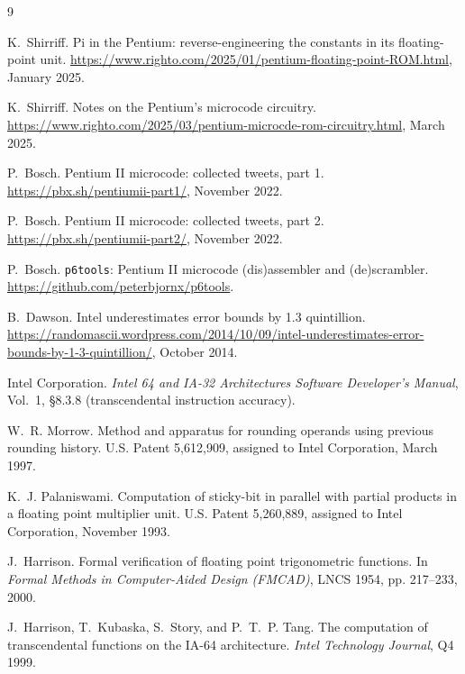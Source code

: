 \documentclass[11pt]{article}
\begin{document}
\clearpage
\begin{thebibliography}{9}
\scriptsize
\raggedright
\itemsep0pt

K.~Shirriff.
\newblock Pi in the Pentium: reverse-engineering the constants in its
  floating-point unit.
\newblock \url{https://www.righto.com/2025/01/pentium-floating-point-ROM.html},
  January 2025.

K.~Shirriff.
\newblock Notes on the Pentium's microcode circuitry.
\newblock \url{https://www.righto.com/2025/03/pentium-microcde-rom-circuitry.html},
  March 2025.

P.~Bosch.
\newblock Pentium II microcode: collected tweets, part 1.
\newblock \url{https://pbx.sh/pentiumii-part1/}, November 2022.

P.~Bosch.
\newblock Pentium II microcode: collected tweets, part 2.
\newblock \url{https://pbx.sh/pentiumii-part2/}, November 2022.

P.~Bosch.
\newblock \texttt{p6tools}: Pentium II microcode (dis)assembler and
  (de)scrambler.
\newblock \url{https://github.com/peterbjornx/p6tools}.

B.~Dawson.
\newblock Intel underestimates error bounds by 1.3 quintillion.
\newblock \url{https://randomascii.wordpress.com/2014/10/09/intel-underestimates-error-bounds-by-1-3-quintillion/},
  October 2014.

Intel Corporation.
\newblock \emph{Intel 64 and IA-32 Architectures Software Developer's
  Manual}, Vol.~1, \S8.3.8 (transcendental instruction accuracy).

W.~R. Morrow.
\newblock Method and apparatus for rounding operands using previous
  rounding history.
\newblock U.S. Patent 5,612,909, assigned to Intel Corporation, March 1997.

K.~J. Palaniswami.
\newblock Computation of sticky-bit in parallel with partial products in a
  floating point multiplier unit.
\newblock U.S. Patent 5,260,889, assigned to Intel Corporation, November 1993.

J.~Harrison.
\newblock Formal verification of floating point trigonometric functions.
\newblock In \emph{Formal Methods in Computer-Aided Design (FMCAD)},
  LNCS 1954, pp. 217--233, 2000.

J.~Harrison, T.~Kubaska, S.~Story, and P.~T.~P. Tang.
\newblock The computation of transcendental functions on the IA-64
  architecture.
\newblock \emph{Intel Technology Journal}, Q4 1999.


\end{thebibliography}
\end{document}
